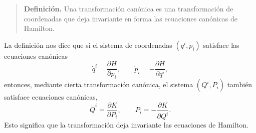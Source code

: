 \documentclass[../apunte_mecanica_clasica.tex]{subfiles}
\begin{document}
\begin{quote}
\textbf{Definición.} Una transformación canónica es una transformación de coordenadas que deja invariante en forma las ecuaciones canónicas de Hamilton.
\end{quote}
La definición nos dice que si el sistema de coordenadas \((q^i,p_i)\) satisface las ecuaciones canónicas
\begin{equation}
    \dot q^i=\frac{\partial H}{\partial p_i},
    \qquad
    \dot p_i=-\frac{\partial H}{\partial q^i},
    \label{eq:tc-ecuaciones-hamilton-antiguas}
\end{equation}
entonces, mediante cierta transformación canónica, el sistema \((Q^i,P_i)\) también satisface ecuaciones canónicas,
\begin{equation}
    \dot Q^i=\frac{\partial K}{\partial P_i},
    \qquad
    \dot P_i=-\frac{\partial K}{\partial Q^i}.
    \label{eq:tc-ecuaciones-hamilton-nuevas-2}
\end{equation}
Esto significa que la transformación deja invariante las ecuaciones de Hamilton.
\end{document}
